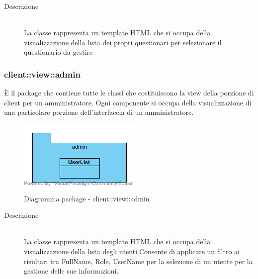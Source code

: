 \vspace{0.5cm}
\hypertarget{client::view::teacher::ManageQuestionnaires}{}
\begin{description}
\item[Descrizione] \hfill \\
La classe rappresenta un template HTML che si occupa della visualizzazione della lista dei propri questionari per selezionare il questionario da gestire
\end{description}

\vspace{0.5cm}
\subsubsection{client::view::admin}
È il package che contiene tutte le classi che costituiscono la view della porzione di client per un amministratore. Ogni componente si occupa della visualizzazione di una particolare porzione dell'interfaccia di un amministratore.\begin{center}
	\begin{figure}[H]
		\centering \includegraphics[scale=4, max width=\textwidth, max height=\myheight]{../img/diagrammiClassi/client/view/admin.png}
		\caption{Diagramma package - client::view::admin}
	\end{figure}
\end{center}\hypertarget{client::view::admin::UsersList}{}
\begin{description}
\item[Descrizione] \hfill \\
La classe rappresenta un template HTML che si occupa della visualizzazione della lista degli utenti.Consente di applicare un filtro ai risultari tra FullName, Role, UserName per la selezione di un utente per la gestione delle sue informazioni.
\end{description}

